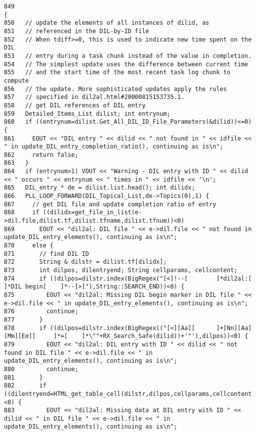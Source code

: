 \footnotesize\begin{verbatim}849                                                                                                                                                                        {
850   // update the elements of all instances of dilid, as
851   // referenced in the DIL-by-ID file
852   // When tdiff>=0, this is used to indicate new time spent on the DIL
853   // entry during a task chunk instead of the value in completion.
854   // The simplest update uses the difference between current time
855   // and the start time of the most recent task log chunk to compute
856   // the update. More sophisticated updates apply the rules
857   // specified in dil2al.html#20000815153735.1.
858   // get DIL references of DIL entry
859   Detailed_Items_List dilist; int entrynum;
860   if ((entrynum=dilist.Get_All_DIL_ID_File_Parameters(&dilid))<=0) {
861     EOUT << "DIL entry " << dilid << " not found in " << idfile << " in update_DIL_entry_completion_ratio(), continuing as is\n";
862     return false;
863   }
864   if (entrynum>1) VOUT << "Warning - DIL entry with ID " << dilid << " occurs " << entrynum << " times in " << idfile << '\n';
865   DIL_entry * de = dilist.list.head(); int dilidx;
866   PLL_LOOP_FORWARD(DIL_Topical_List,de->Topics(0),1) {
867     // get DIL file and update completion ratio of entry
868     if ((dilidx=get_file_in_list(e->dil.file,dilist.tf,dilist.tfname,dilist.tfnum))<0)
869       EOUT << "dil2al: DIL file " << e->dil.file << " not found in update_DIL_entry_elements(), continuing as is\n";
870     else {
871       // find DIL ID
872       String & dilstr = dilist.tf[dilidx];
873       int dilpos, dilentryend; String cellparams, cellcontent;
874       if ((dilpos=dilstr.index(BigRegex("[<]!--[        ]*dil2al:[      ]*DIL begin[    ]*--[>]"),String::SEARCH_END))<0) {
875         EOUT << "dil2al: Missing DIL begin marker in DIL file " << e->dil.file << " in update_DIL_entry_elements(), continuing as is\n";
876         continue;
877       }
878       if ((dilpos=dilstr.index(BigRegex(("[<][Aa][      ]+[Nn][Aa][Mm][Ee][     ]*=[    ]*\""+RX_Search_Safe(dilid))+'"'),dilpos))<0) {
879         EOUT << "dil2al: DIL entry with ID " << dilid << " not found in DIL file " << e->dil.file << " in update_DIL_entry_elements(), continuing as is\n";
880         continue;
881       }
882       if ((dilentryend=HTML_get_table_cell(dilstr,dilpos,cellparams,cellcontent,&dilpos))<0) {
883         EOUT << "dil2al: Missing data at DIL entry with ID " << dilid << " in DIL file " << e->dil.file << " in update_DIL_entry_elements(), continuing as is\n";

\end{verbatim}
